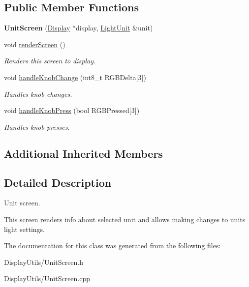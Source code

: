 \subsection*{Public Member Functions}
\begin{DoxyCompactItemize}
\item 
\mbox{\label{classUnitScreen_aec9e9c593e2c59025096fd01529c874b}} 
{\bfseries Unit\+Screen} (\mbox{\hyperlink{classDisplay}{Display}} $\ast$display, \mbox{\hyperlink{classLightUnit}{Light\+Unit}} \&unit)
\item 
\mbox{\label{classUnitScreen_aa6baad6ccef6da111a44d763de359bb8}} 
void \mbox{\hyperlink{classUnitScreen_aa6baad6ccef6da111a44d763de359bb8}{render\+Screen}} ()
\begin{DoxyCompactList}\small\item\em Renders this screen to display. \end{DoxyCompactList}\item 
\mbox{\label{classUnitScreen_a4eea15b5c63c97c5a072b151cfa05e84}} 
void \mbox{\hyperlink{classUnitScreen_a4eea15b5c63c97c5a072b151cfa05e84}{handle\+Knob\+Change}} (int8\+\_\+t R\+G\+B\+Delta\mbox{[}3\mbox{]})
\begin{DoxyCompactList}\small\item\em Handles knob changes. \end{DoxyCompactList}\item 
\mbox{\label{classUnitScreen_a45956efc8827ebfdddaf83d7c44db135}} 
void \mbox{\hyperlink{classUnitScreen_a45956efc8827ebfdddaf83d7c44db135}{handle\+Knob\+Press}} (bool R\+G\+B\+Pressed\mbox{[}3\mbox{]})
\begin{DoxyCompactList}\small\item\em Handles knob presses. \end{DoxyCompactList}\end{DoxyCompactItemize}
\subsection*{Additional Inherited Members}


\subsection{Detailed Description}
Unit screen. 

This screen renders info about selected unit and allows making changes to units light settings. 

The documentation for this class was generated from the following files\+:\begin{DoxyCompactItemize}
\item 
Display\+Utils/Unit\+Screen.\+h\item 
Display\+Utils/Unit\+Screen.\+cpp\end{DoxyCompactItemize}
